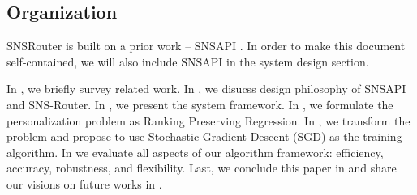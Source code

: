 \documentclass{sig-alternate}
\begin{document}
\subsection{Organization}
\label{sec:Organization}

SNSRouter \cite{github_snsapi} is built on a prior work -- SNSAPI \cite{github_snsapi}.
In order to make this document self-contained, 
we will also include SNSAPI in the system design section. 

In 
\rsec{\ref{sec:Related Work}}
, we briefly survey related work. 
In 
\rsec{\ref{sec:Philosophy}}
, we disucss design philosophy of SNSAPI and SNS-Router. 
In 
\rsec{\ref{sec:System Framework}}
, we present the system framework. 
In 
\rsec{\ref{sec:Formulation}}
, we formulate the personalization problem as Ranking Preserving Regression. 
In
\rsec{\ref{sec:Algorithm Design}}
, we transform the problem and propose to use 
Stochastic Gradient Descent (SGD) as the training algorithm. 
In 
\rsec{\ref{sec:Evaluation}}
we evaluate all aspects of our algorithm framework:
efficiency, accuracy, robustness, and flexibility. 
Last, we conclude this paper in 
\rsec{\ref{sec:Conclusion}}
and share our visions on future works in 
\rsec{\ref{sec:Future Work}}
.

\end{document}
